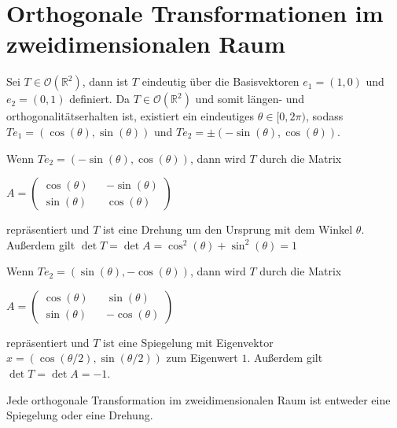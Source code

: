 \section{Orthogonale Transformationen im zweidimensionalen Raum}
\begin{bem}
 Sei $T \in \mathcal{O}(\mathbb{R}^2)$, dann ist $T$ eindeutig über die Basisvektoren $e_1=(1,0)$ und $e_2=(0,1)$ definiert. Da $T \in \mathcal{O}(\mathbb{R}^2)$ und somit längen- und orthogonalitätserhalten ist, existiert ein eindeutiges $\theta \in [0,2 \pi)$, sodass $Te_1=(\cos(\theta),\sin(\theta))$ und $Te_2=\pm(-\sin(\theta),\cos(\theta))$.
 
 Wenn $Te_2=(-\sin(\theta),\cos(\theta))$, dann wird $T$ durch die Matrix 
 \begin{center}
  $A = \begin{pmatrix}
        \cos(\theta) && -\sin(\theta) \\
        \sin(\theta) && \cos(\theta)
       \end{pmatrix}$

 \end{center}
repräsentiert und $T$ ist eine Drehung um den Ursprung mit dem Winkel $\theta$. Außerdem gilt $\det T = \det A = \cos^2(\theta) + \sin^2(\theta) = 1$

Wenn $Te_2=(\sin(\theta),-\cos(\theta))$, dann wird $T$ durch die Matrix 
 \begin{center}
  $A = \begin{pmatrix}
        \cos(\theta) && \sin(\theta) \\
        \sin(\theta) && -\cos(\theta)
       \end{pmatrix}$

 \end{center}
repräsentiert und $T$ ist eine Spiegelung mit Eigenvektor $x=(\cos(\theta/2),\sin(\theta/2))$ zum Eigenwert $1$. Außerdem gilt $\det T = \det A = -1$. 
\end{bem}
\begin{theorem}
 Jede orthogonale Transformation im zweidimensionalen Raum ist entweder eine Spiegelung oder eine Drehung.
\end{theorem}